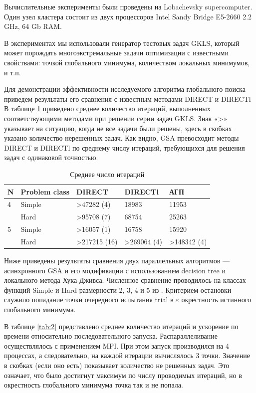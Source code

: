 \documentclass{svproc}
\begin{document}
Вычислительные эксперименты были проведены на Lobachevsky supercomputer. Один узел кластера состоит из двух процессоров Intel Sandy Bridge E5-2660 2.2 GHz, 64 Gb RAM. 

В экспериментах мы использовали генератор тестовых задач GKLS, который может порождать многоэкстремальные задачи оптимизации с известными свойствами: точкой глобального минимума, количеством локальных минимумов, и т.п.

Для демонстрации эффективности исследуемого алгоритма глобального поиска приведем результаты его сравнения с известным методами DIRECT и DIRECTl
В таблице \ref{tab:1} приведено среднее количество итераций, выполненных соответствующими методами при решении серии задач GKLS. Знак «>» указывает на ситуацию, когда не все задачи были решены, здесь в скобках указано количество нерешенных задач. Как видно, GSA превосходит методы DIRECT и DIRECTl по среднему числу итераций, требующихся для решения задач с одинаковой точностью.

\begin{table}[!ht]
    \caption{Среднее число итераций}
    \label{tab:1}
    \centering
    \begin{tabular}{|l|l|l|l|l|}
    \hline
        N & Problem class & DIRECT & DIRECTl & АГП  \\ \hline
        4 & Simple & >47282 (4) & 18983 & 11953  \\ \hline
        ~ & Hard & >95708 (7) & 68754 & 25263  \\ \hline
        5 & Simple & >16057 (1) & 16758 & 15920  \\ \hline
        ~ & Hard & >217215 (16) & >269064 (4) & >148342 (4)  \\ \hline
    \end{tabular}
\end{table}


Ниже приведены результаты сравнения двух параллельных алгоритмов --- асинхронного GSA и его модификации с использованием decision tree и локального метода Хука-Дживса. Численное сравнение проводилось на классах функций Simple и Hard размерности 2, 3, 4 и 5 из \cite{fio_bib19}. Критерием остановки служило попадание точки очередного испытания trial в $\varepsilon$ окрестность истинного глобального минимума. 

В таблице \ref{tab:2} представлено среднее количество итераций и ускорение по времени относительно последовательного запуска. Распараллеливание  осуществлялось с применением  MPI. При этом запуск производился на 4 процессах, а следовательно, на каждой итерации вычислялось 3 точки. Значение в скобках (если оно есть) показывает количество не решенных задач. Это означает, что было достигнут максимум по числу проводимых итераций, но в окрестность глобального минимума точка так и не попала.
\end{document}
